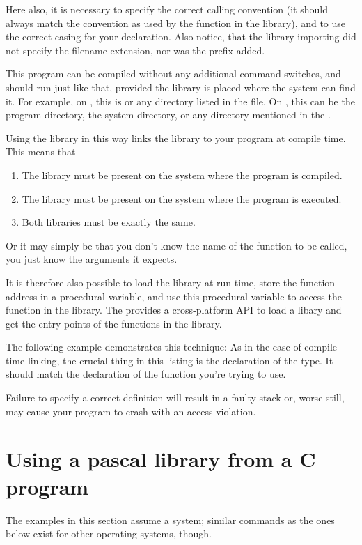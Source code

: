 Here also, it is necessary to specify the correct calling convention (it
should always match the convention as used by the function in the library),
and to use the correct casing for your declaration. Also notice, that
the library importing did not specify the filename extension, nor
was the  prefix added.

This program can be compiled without any additional command-switches,
and should run just like that, provided the library is placed where
the system can find it. For example, on \linux, this is  or any
directory listed in the  file. On \windows, this
can be the program directory, the \windows system directory, or any directory
mentioned in the .

Using the library in this way links the library to your program at compile
time. This means that
\begin{enumerate}
\item The library must be present on the system where the program is
compiled.
\item The library must be present on the system where the program is
executed.
\item Both libraries must be exactly the same.
\end{enumerate}
Or it may simply be that you don't know the name of the function to
be called, you just know the arguments it expects.

It is therefore also possible to load the library at run-time, store
the function address in a procedural variable, and use this procedural
variable to access the function in the library. The  provides
a cross-platform API to load a libary and get the entry points of the
functions in the library. 

The following example demonstrates this technique:
As in the case of compile-time linking, the crucial thing in this
listing is the declaration of the  type.
It should match the declaration of the function you're trying to use.

Failure to specify a correct definition will result in a faulty stack or,
worse still, may cause your program to crash with an access violation.

\section{Using a pascal library from a C program}

\begin{remark}The examples in this section assume a \linux system; similar commands
as the ones below exist for other operating systems, though.
\end{remark}

